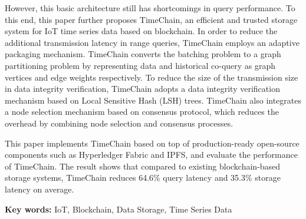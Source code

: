 However, this basic architecture still has shortcomings in query performance.
To this end, this paper further proposes TimeChain, an efficient and trusted storage system for IoT time series data based on blockchain.
In order to reduce the additional transmission latency in range queries, TimeChain employs an adaptive packaging mechanism. 
TimeChain converts the batching problem to a graph partitioning problem by representing data and historical co-query as graph vertices and edge weights respectively.
To reduce the size of the transmission size in data integrity verification, TimeChain adopts a data integrity verification mechanism based on Local Sensitive Hash (LSH) trees.
TimeChain also integrates a node selection mechanism based on consensus protocol, which reduces the overhead by combining node selection and consensus processes.

This paper implements TimeChain based on top of production-ready open-source components such as Hyperledger Fabric and IPFS, and evaluate the performance of TimeChain. 
The result shows that compared to existing blockchain-based storage systems, TimeChain reduces 64.6\% query latency and 35.3\% storage latency on average.


{\noindent \textbf{Key words:} IoT, Blockchain, Data Storage, Time Series Data}
